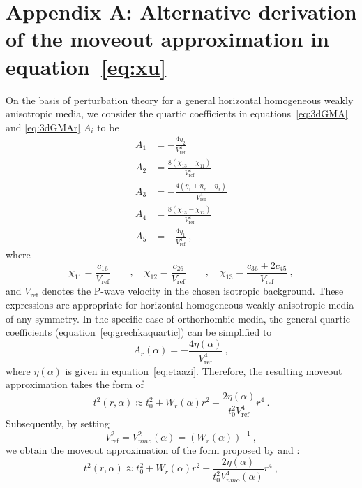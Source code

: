 \section{Appendix A: Alternative derivation of the moveout approximation in equation~\ref{eq:xu}}
On the basis of perturbation theory for a general horizontal homogeneous weakly anisotropic media, we consider the quartic coefficients in equations~\ref{eq:3dGMA} and \ref{eq:3dGMAr} $A_i$ to be \cite[]{grechkapech,fpj}
\begin{align}
\label{eq:grechkaquartic}
A_1 & = -\frac{4\eta_2}{V^4_{\mbox{ref}}}\\ \nonumber
A_2 & = \frac{8(\chi_{13}-\chi_{11})}{V^4_{\mbox{ref}}} \\ \nonumber
A_3 & = -\frac{4(\eta_1+\eta_2-\eta_3)}{V^4_{\mbox{ref}}}\\ \nonumber
A_4 & = \frac{8(\chi_{13}-\chi_{12})}{V^4_{\mbox{ref}}} \\ \nonumber
A_5 & = -\frac{4\eta_1}{V^4_{\mbox{ref}}}~,
\end{align}
where 
\begin{equation}
\chi_{11} = \frac{c_{16}}{V_{\mbox{ref}}} \qquad, \quad\chi_{12} = \frac{c_{26}}{V_{\mbox{ref}}} \qquad, \quad\chi_{13} = \frac{c_{36}+2c_{45}}{V_{\mbox{ref}}}~,
\end{equation}
and $V_{\mbox{ref}}$ denotes the P-wave velocity in the chosen isotropic background. These expressions are appropriate for horizontal homogeneous weakly anisotropic media of any symmetry.  In the specific case of orthorhombic media, the general quartic coefficients (equation~\ref{eq:grechkaquartic}) can be simplified to
\begin{equation}
A_r(\alpha) = -\frac{4\eta(\alpha)}{V^4_{\mbox{ref}}}~,
\end{equation}
where $\eta(\alpha)$ is given in equation~\ref{eq:etaazi}. Therefore, the resulting moveout approximation takes the form of
\begin{equation}
    t^2(r,\alpha) \approx t^2_0 + W_r(\alpha)r^2-\frac{2\eta(\alpha)}{t^2_0 V^4_{\mbox{ref}}}r^4~.
\end{equation} 
Subsequently, by setting 
\begin{equation}
V^2_{\mbox{ref}} = V^2_{nmo} (\alpha) = (W_r(\alpha))^{-1}~,
\end{equation}
we obtain the moveout approximation of the form proposed by \cite{xu} and \cite{vascon}:
\begin{equation}
\label{eq:xunolong}
    t^2(r,\alpha) \approx t^2_0 + W_r(\alpha)r^2-\frac{2\eta(\alpha)}{t^2_0 V^4_{nmo}(\alpha)}r^4~,
\end{equation} 
